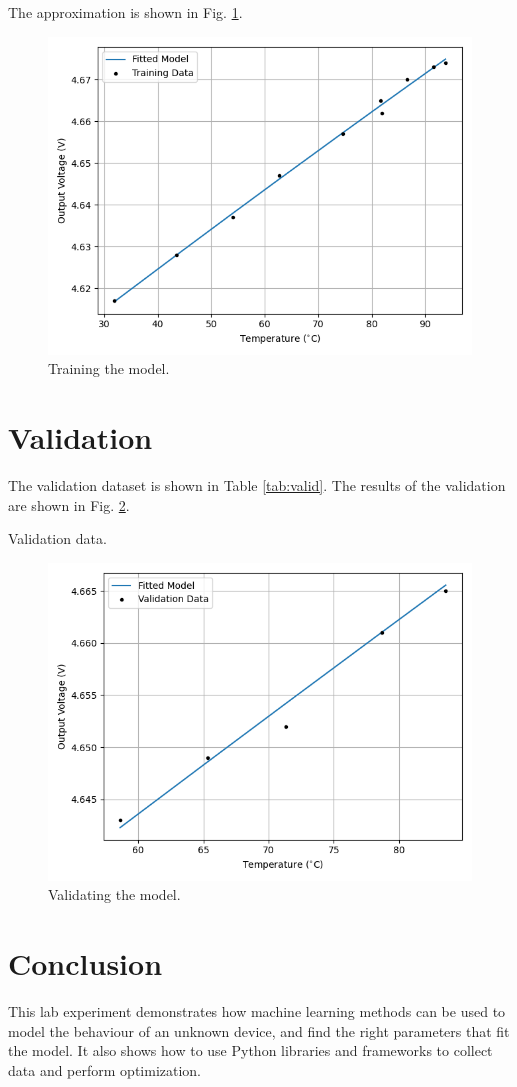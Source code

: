 \documentclass[journal,12pt,twocolumn]{IEEEtran}
\begin{document}
The approximation is shown in Fig. \ref{fig:train}.
\begin{figure}[!ht]
    \centering
    \includegraphics[width=\columnwidth]{figs/train.png}
    \caption{Training the model.}
    \label{fig:train}
\end{figure}

\section{Validation}
The validation dataset is shown in Table \ref{tab:valid}. The results of the 
validation are shown in Fig. \ref{fig:valid}.
\begin{table}[!ht]
    \centering
    
    \caption{Validation data.}
    \label{tab:valid}
\end{table}
\begin{figure}[!ht]
    \centering
    \includegraphics[width=\columnwidth]{figs/valid.png}
    \caption{Validating the model.}
    \label{fig:valid}
\end{figure}

\section{Conclusion}

This lab experiment demonstrates how machine learning methods can be used to 
model the behaviour of an unknown device, and find the right parameters that 
fit the model. It also shows how to use Python libraries and frameworks to
collect data and perform optimization.
\end{document}
